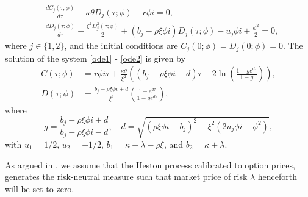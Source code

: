 \begin{align}
    &\frac{dC_{j}(\tau;\phi)}{d\tau}-\kappa\theta D_{j}(\tau;\phi) - r\phi i=0,\label{ode1}\\
    &\frac{dD_{j}(\tau;\phi)}{d\tau}-\frac{\xi^{2}D_{j}^{2}(\tau;\phi)}{2} + (b_{j}-\rho\xi\phi i)D_{j}(\tau;\phi) - u_{j}\phi i + \frac{\phi^2}{2}=0,\label{ode2}
\end{align}
where $j\in\{1,2\}$, and the initial conditions are $C_{j}(0;\phi)=D_{j}(0;\phi)=0$. The solution of the system \ref{ode1} - \ref{ode2} is given by
\begin{align}
    C(\tau;\phi)&=r\phi i\tau+\frac{\kappa\theta}{\xi^{2}}\left((b_{j}-\rho\xi \phi i+d)\tau -2\ln\left(\frac{1-ge^{d\tau}}{1-g}\right)\right),\\
    D(\tau;\phi)&=\frac{b_{j}-\rho\xi\phi i+d}{\xi^{2}}\left(\frac{1-e^{d\tau}}{1-ge^{d\tau}}\right),
\end{align}
where 
\begin{equation*}
    g=\frac{b_{j}-\rho\xi\phi i+d}{b_{j}-\rho\xi\phi i-d}, \quad d=\sqrt{(\rho\xi\phi i-b_{j})^{2}-\xi^{2}(2u_{j}\phi i-\phi^{2})},
\end{equation*}
with $u_{1}=1/2$, $u_{2}=-1/2$, $b_{1}=\kappa + \lambda-\rho\xi$, and $b_{2}=\kappa + \lambda$. 

As argued in \cite[p.~16]{volsurface}, we assume that the Heston process calibrated to option prices, generates the risk-neutral measure such that market price of risk $\lambda$ henceforth will be set to zero. 

